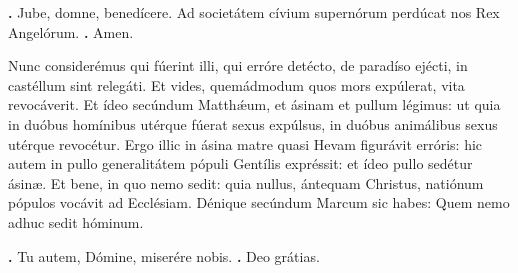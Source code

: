 \begin{small}
\textbf{\Vbar.} Jube, domne, benedícere.
  \hspace{.3em}
Ad societátem cívium supernórum perdúcat nos Rex Angelórum. \textbf{\Rbar.} Amen.
\end{small}


Nunc considerémus qui fúerint illi, qui erróre detécto, de paradíso ejécti, in castéllum sint relegáti. Et vides, quemádmodum quos mors expúlerat, vita revocáverit. Et ídeo secúndum Matth\'{\ae}um, et ásinam et pullum légimus: ut quia in duóbus homínibus utérque fúerat sexus expúlsus, in duóbus animálibus sexus utérque revocétur. Ergo illic in ásina matre quasi Hevam figurávit erróris: hic autem in pullo generalitátem pópuli Gentílis expréssit: et ídeo pullo sedétur ásinæ. Et bene, in quo nemo sedit: quia nullus, ántequam Christus, natiónum pópulos vocávit ad Ecclésiam. Dénique secúndum Marcum sic habes: Quem nemo adhuc sedit hóminum.

\textbf{\Vbar.} Tu autem, Dómine, miserére nobis.
\textbf{\Rbar.} Deo grátias.


